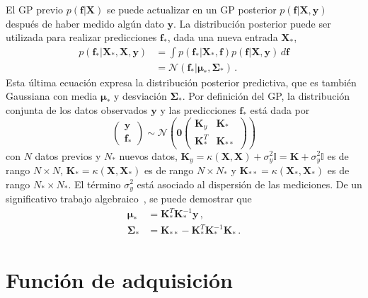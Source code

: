 El GP previo $p(\mathbf{f}|\mathbf{X})$ se puede actualizar en un GP
posterior $p(\mathbf{f}|\mathbf{X},\mathbf{y})$ después de haber medido
algún dato $\mathbf{y}$. La distribución posterior puede ser utilizada 
para realizar predicciones $\mathbf{f}_*$, dada una nueva entrada 
$\mathbf{X}_*$,
\begin{align}
p(\mathbf{f}_*|\mathbf{X}_*,\mathbf{X},\mathbf{y})
&=\int p(\mathbf{f}_*|\mathbf{X}_*,\mathbf{f}) p(\mathbf{f}|\mathbf{X},
\mathbf{y})\,d\mathbf{f} \\
&=\mathcal{N}(\mathbf{f}_*|\boldsymbol\mu_*,\boldsymbol\Sigma_*)\,.
\end{align}
Esta última ecuación expresa la distribución posterior predictiva, que 
es también Gaussiana con media $\boldsymbol\mu_*$ y desviación 
$\boldsymbol\Sigma_*$. Por definición del GP, la distribución conjunta
de los datos observados $\mathbf{y}$ y las predicciones $\mathbf{f}_*$ 
está dada por
\begin{equation}
\left(\begin{array}{c}
\mathbf{y}\\
\mathbf{f}_*
\end{array} 
\right)\sim\mathcal{N}\left(\mathbf{0}
\left(
\begin{array}{cc}
\mathbf{K}_y & \mathbf{K}_* \\
\mathbf{K}_*^T & \mathbf{K}_{**}
\end{array}
\right)
\right)
\end{equation}
con $N$ datos previos y $N_*$ nuevos datos, 
$\mathbf{K}_y=\kappa(\mathbf{X},\mathbf{X})+\sigma_y^2\mathbb{I} = 
\mathbf{K}+\sigma_y^2\mathbb{I}$ es de rango $N\times N$, 
$\mathbf{K}_*=\kappa(\mathbf{X},\mathbf{X}_*)$ es de rango $N\times N_*$
y $\mathbf{K}_{**}=\kappa(\mathbf{X}_*,\mathbf{X}_*)$ es de rango 
$N_*\times N_*$. El término $\sigma_y^2$ está asociado al dispersión de 
las mediciones. De un significativo trabajo algebraico~\cite{Murphy:12,
Rasmussen:06,deFreitas:13}, se puede demostrar que
\begin{align}
\boldsymbol\mu_*&=\mathbf{K}_*^T\mathbf{K}_*^{-1}\mathbf{y}\,, \\
\boldsymbol\Sigma_*&=\mathbf{K}_{**}-\mathbf{K}_*^T\mathbf{K}_*^{-1}
\mathbf{K}_*\,.
\end{align}

\section*{Función de adquisición}

